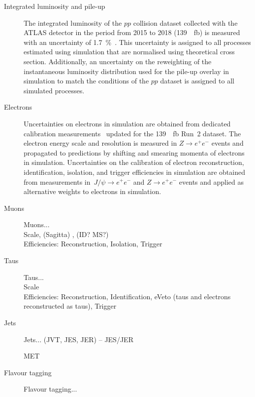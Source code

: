 \begin{description}
\item[Integrated luminosity and pile-up] The integrated luminosity of
  the $pp$ collision dataset collected with the ATLAS detector in the
  period from 2015 to 2018 (\SI{139}{\per\femto\barn}) is measured
  with an uncertainty of
  \SI{1.7}{\percent}~\cite{ATLAS-CONF-2019-021}. This uncertainty is
  assigned to all processes estimated using simulation that are
  normalised using theoretical cross section. Additionally, an
  uncertainty on the reweighting of the instantaneous luminosity
  distribution used for the pile-up overlay in simulation to match the
  conditions of the $pp$ dataset is assigned to all simulated
  processes.

\item[Electrons] Uncertainties on electrons in simulation are obtained
  from dedicated calibration
  measurements~\cite{EGAM-2018-01,TRIG-2018-05} updated for the
  \SI{139}{\per\femto\barn} Run~2 dataset. The electron energy scale
  and resolution is measured in $Z \to e^+e^-$ events and propagated
  to predictions by shifting and smearing momenta of electrons in
  simulation. Uncertainties on the calibration of electron
  reconstruction, identification, isolation, and trigger efficiencies
  in simulation are obtained from measurements in~$J/\psi \to e^+e^-$
  and $Z \to e^+e^-$ events and applied as alternative weights to
  electrons in simulation.

\item[Muons]
  Muons... \cite{MUON-2018-03} \\
  Scale, (Sagitta) , (ID? MS?) \\
  Efficiencies: Reconstruction, Isolation, Trigger

\item[Taus]
  Taus... \\
  Scale \\
  Efficiencies: Reconstruction, Identification, eVeto (taus and
  electrons reconstructed as taus), Trigger

\item[Jets] Jets... (JVT, JES, JER) -- JES/JER \cite{JETM-2018-05}

\item[\pTmissAbs] MET

\item[Flavour tagging] Flavour tagging... \cite{FTAG-2018-01}

\end{description}

